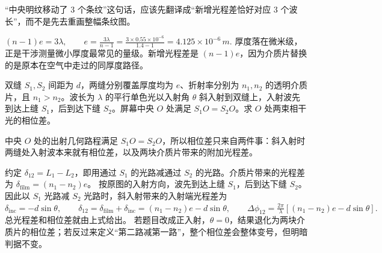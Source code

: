 \documentclass[lang=cn,11pt]{elegantbook}
\begin{document}
\begin{solution}
“中央明纹移动了 3 个条纹”这句话，应该先翻译成“新增光程差恰好对应 3 个波长”，而不是先去重画整幅条纹图。

 \((n-1)e=3\lambda,\qquad e=\frac{3\lambda}{n-1} =\frac{3\times0.55\times10^{-6}}{1.4-1} =4.125\times10^{-6}\,\si{m}.\) 
厚度落在微米级，正是干涉测量微小厚度最常见的量级。新增光程差是 \((n-1)e\)，因为介质片替换的是原本在空气中走过的同厚度路径。
\end{solution}


\begin{exercise}
双缝 \(S_1,S_2\) 间距为 \(d\)，两缝分别覆盖厚度均为 \(e\)、折射率分别为 \(n_1,n_2\) 的透明介质片，且 \(n_1>n_2\)。波长为 \(\lambda\) 的平行单色光以入射角 \(\theta\) 斜入射到双缝上，入射波先到达上缝 \(S_1\)，后到达下缝 \(S_2\)。屏幕中央 \(O\) 处满足 \(S_1O=S_2O\)。求 \(O\) 处两束相干光的相位差。

\begin{center}
\end{center}
\end{exercise}

\begin{solution}
中央 \(O\) 处的出射几何路程满足 \(S_1O=S_2O\)，所以相位差只来自两件事：斜入射时两缝处入射波本来就有相位差，以及两块介质片带来的附加光程差。

约定 \(\delta_{12}=L_1-L_2\)，即用通过 \(S_1\) 的光路减通过 \(S_2\) 的光路。介质片带来的光程差为 \(\delta_{\text{film}}=(n_1-n_2)e\)。
按原图的入射方向，波先到达上缝 \(S_1\)，后到达下缝 \(S_2\)。因此以 \(S_1\) 光路减 \(S_2\) 光路时，斜入射带来的入射端光程差为
 \(\delta_{\text{inc}}=-d\sin\theta,\qquad \delta_{12}=\delta_{\text{film}}+\delta_{\text{inc}} =(n_1-n_2)e-d\sin\theta,\qquad \Delta\phi_{12}=\frac{2\pi}{\lambda}\left[(n_1-n_2)e-d\sin\theta\right].\) 
总光程差和相位差就由上式给出。
若题目改成正入射，\(\theta=0\)，结果退化为两块介质片的相位差；若反过来定义“第二路减第一路”，整个相位差会整体变号，但明暗判据不变。
\end{solution}
\end{document}
